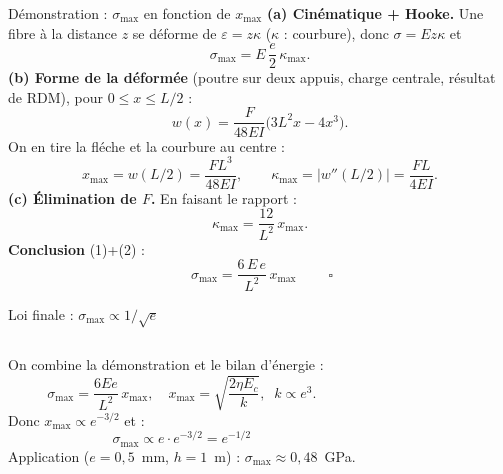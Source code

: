 \documentclass[11pt,aspectratio=169]{beamer}
\begin{document}
\begin{frame}{Démonstration : $\sigma_{\max}$ en fonction de $x_{\max}$}
  \footnotesize
  \textbf{(a) Cinématique + Hooke.} Une fibre à la distance $z$ se déforme de
  $\varepsilon=z\kappa$ ($\kappa$ : courbure), donc $\sigma=E z\kappa$ et
  \[ \sigma_{\max}=E\,\frac{e}{2}\,\kappa_{\max}. \tag{1}\]
  \textbf{(b) Forme de la déformée} (poutre sur deux appuis, charge centrale,
  résultat de RDM), pour $0\le x\le L/2$ :
  \[ w(x)=\frac{F}{48EI}\big(3L^{2}x-4x^{3}\big). \]
  On en tire la fléche et la courbure au centre :
  \[ x_{\max}=w(L/2)=\frac{FL^{3}}{48EI},\qquad
     \kappa_{\max}=\big|w''(L/2)\big|=\frac{FL}{4EI}. \]
  \textbf{(c) Élimination de $F$.} En faisant le rapport :
  \[ \kappa_{\max}=\frac{12}{L^{2}}\,x_{\max}. \tag{2}\]
  \textbf{Conclusion} (1)+(2) :
  \[ \boxed{\;\sigma_{\max}=\frac{6\,E\,e}{L^{2}}\,x_{\max}\;}\qquad\square \]
\end{frame}

\begin{frame}{Loi finale : $\sigma_{\max}\propto 1/\sqrt{e}$}
  \begin{columns}[c]
    \footnotesize
    On combine la démonstration et le bilan d'énergie :
    \[ \sigma_{\max}=\frac{6Ee}{L^{2}}\,x_{\max},\quad
       x_{\max}=\sqrt{\frac{2\eta E_c}{k}},\;\; k\propto e^{3}. \]
    Donc $x_{\max}\propto e^{-3/2}$ et :
    \[ \boxed{\;\sigma_{\max}\propto e\cdot e^{-3/2}=e^{-1/2}\;} \]
    Application ($e=0{,}5$~mm, $h=1$~m) : $\sigma_{\max}\approx 0{,}48$~GPa.
  \end{columns}
\end{frame}
\end{document}
